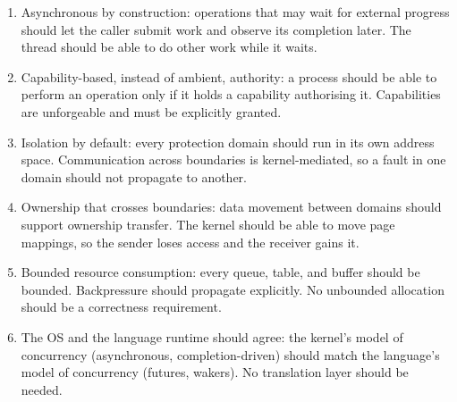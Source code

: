 \begin{enumerate}
    \item Asynchronous by construction: operations that may wait for
        external progress should let the caller submit work and observe its
        completion later. The thread should be able to do other work while it waits.

    \item Capability-based, instead of ambient, authority: a process should be
        able to perform an operation only if it holds a capability authorising it.
        Capabilities are unforgeable and must be explicitly granted.

    \item Isolation by default: every protection domain should run in its
        own address space. Communication across boundaries is kernel-mediated,
        so a fault in one domain should not propagate to another.

    \item Ownership that crosses boundaries: data movement between
        domains should support ownership transfer. The kernel should be able to
        move page mappings, so the sender loses access and the receiver gains it.

    \item Bounded resource consumption: every queue, table, and buffer
        should be bounded. Backpressure should propagate explicitly. No unbounded
        allocation should be a correctness requirement.

    \item The OS and the language runtime should agree: the kernel's model
        of concurrency (asynchronous, completion-driven) should match the
        language's model of concurrency (futures, wakers). No translation layer
        should be needed.
\end{enumerate}

\endinput
